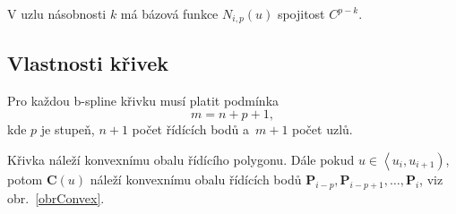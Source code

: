 \begin{veta}
	V uzlu násobnosti $k$ má bázová funkce $N_{i,p}\left(u\right)$ spojitost $C^{p-k}$.
\end{veta}

\subsection{Vlastnosti křivek}

\begin{poznamka}
	Pro každou b-spline křivku musí platit podmínka
	\begin{equation}
	m=n+p+1,
	\end{equation}
	kde $p$ je stupeň, $n+1$ počet řídících bodů a~$m+1$ počet uzlů.
\end{poznamka}




\begin{veta}
	\label{convex-hull}
	Křivka náleží konvexnímu obalu řídícího polygonu. Dále pokud $u\in\left\langle u_i,u_{i+1}\right) $, potom $\mathbf{C}\left(u\right)$ náleží konvexnímu obalu řídících bodů $\mathbf{P}_{i-p},\mathbf{P}_{i-p+1},\dots,\mathbf{P}_i$, viz obr.~\ref{obrConvex}.
\end{veta}

